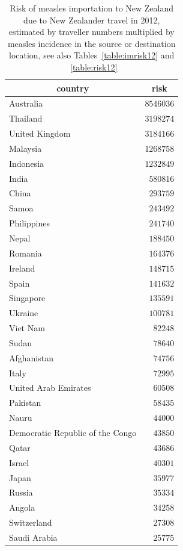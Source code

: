 \documentclass{article}
\begin{document}
\begin{table}
\caption{Risk of measles importation to New Zealand due to New Zealander travel in 2012, estimated by traveller numbers multiplied by measles incidence in the source or destination location, see also Tables~\autoref{table:imrisk12} and ~\autoref{table:risk12}}
\begin{center}
\begin{tabular}{lr}
\hline\hline
\multicolumn{1}{c}{country}&\multicolumn{1}{c}{risk}\tabularnewline
\hline
Australia&$8546036$\tabularnewline
Thailand&$3198274$\tabularnewline
United Kingdom&$3184166$\tabularnewline
Malaysia&$1268758$\tabularnewline
Indonesia&$1232849$\tabularnewline
India&$ 580816$\tabularnewline
China&$ 293759$\tabularnewline
Samoa&$ 243492$\tabularnewline
Philippines&$ 241740$\tabularnewline
Nepal&$ 188450$\tabularnewline
Romania&$ 164376$\tabularnewline
Ireland&$ 148715$\tabularnewline
Spain&$ 141632$\tabularnewline
Singapore&$ 135591$\tabularnewline
Ukraine&$ 100781$\tabularnewline
Viet Nam&$  82248$\tabularnewline
Sudan&$  78640$\tabularnewline
Afghanistan&$  74756$\tabularnewline
Italy&$  72995$\tabularnewline
United Arab Emirates&$  60508$\tabularnewline
Pakistan&$  58435$\tabularnewline
Nauru&$  44000$\tabularnewline
Democratic Republic of the Congo&$  43850$\tabularnewline
Qatar&$  43686$\tabularnewline
Israel&$  40301$\tabularnewline
Japan&$  35977$\tabularnewline
Russia&$  35334$\tabularnewline
Angola&$  34258$\tabularnewline
Switzerland&$  27308$\tabularnewline
Saudi Arabia&$  25775$\tabularnewline
\hline
\end{tabular}\end{center}\label{table:nzrisk12}
\end{table}
\end{document}
